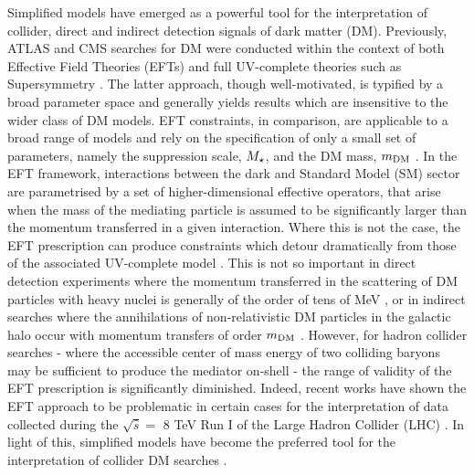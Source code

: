 
Simplified models have emerged as a powerful tool for the interpretation of collider, direct and indirect detection signals of dark matter (DM). Previously, ATLAS and CMS searches for DM were conducted within the context of both Effective Field Theories (EFTs) \cite{Aad:1363019, ATLAS-CONF-2012-147, CMS-PAS-EXO-12-048, Abdallah:1472683} and full UV-complete theories such as Supersymmetry \cite{Aad:2012ms, Aad:2012fqa, Aad:2014wea, SUSY_official_paper}.  The latter approach, though well-motivated, is typified by a broad parameter space and generally yields results which are insensitive to the wider class of DM models. EFT constraints, in comparison, are applicable to a broad range of models and rely on the specification of only a small set of parameters, namely the suppression scale, $M_{\star}$, and the DM mass, $m_{\mathrm{DM}}$ \cite{DMCons2}.
In the EFT framework, interactions between the dark and Standard Model (SM) sector are parametrised by a set of higher-dimensional effective operators, that arise when the mass of the mediating particle is assumed to be significantly larger than the momentum transferred in a given interaction. Where this is not the case, the EFT prescription can produce constraints which detour dramatically from those of the associated UV-complete model \cite{Bai:2010hh, DMCons2, Fox:2011fx, Graesser:2011vj, An:2011ck}. This is not so important in direct detection experiments where the momentum transferred in the scattering of DM particles with heavy nuclei is generally of the order of tens of MeV \cite{EFTDM, DMCons3}, or in indirect searches where the annihilations of non-relativistic DM particles in the galactic halo occur with momentum transfers of order $m_{\mathrm{DM}}$ \cite{}. However, for hadron collider searches - where the accessible center of mass energy of two colliding baryons may be sufficient to produce the mediator on-shell - the range of validity of the EFT prescription is significantly diminished. Indeed, recent works have shown the EFT approach to be problematic in certain cases for the interpretation of data collected during the $\sqrt{\hat{s}} =$ 8 TeV Run I of the Large Hadron Collider (LHC) \cite{ValidEFT, ValidEFT_part2, ValidEFT_part3}. In light of this, simplified models have become the preferred tool for the interpretation of collider DM searches \cite{DM_MET_LHC, DMOxfordReport, DMForumReport, Harris:2014hga,Buchmueller:2014yoa}.

